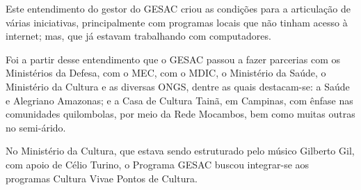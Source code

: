 \documentclass[
12pt,		%
openright,	%
twoside,  %
a4paper,			%
chapter=TITLE,		%
english,			%
french,				%
spanish,			%
brazil				%
]{USPSC-classe/USPSC}
\begin{document}
\noindent\begin{center}\mbox{\centering{}}\end{center}


Este entendimento do gestor do GESAC criou as condi\c{c}\~oes para a articula\c{c}\~ao de v\'arias iniciativas, principalmente com programas locais que n\~ao tinham acesso \`a internet; mas, que j\'a estavam trabalhando com computadores.









Foi a partir desse entendimento que o GESAC passou a fazer parcerias com os Minist\'erios da Defesa, com o MEC, com o MDIC, o Minist\'erio da Sa\'ude, o Minist\'erio da Cultura e as diversas ONGS, dentre as quais destacam-se: a \textquotedbl Sa\'ude e Alegria\textquotedbl  no Amazonas; e a \textquotedbl Casa de Cultura Tain\~a\textquotedbl , em Campinas, com \^enfase nas comunidades quilombolas, por meio da Rede Mocambos, bem como muitas outras no semi-\'arido.










\noindent\begin{center}\mbox{\centering{}}\end{center}


No Minist\'erio da Cultura, que estava sendo estruturado pelo m\'usico Gilberto Gil, com apoio de C\'elio Turino, o Programa GESAC buscou integrar-se aos programas \textquotedbl Cultura Viva\textquotedbl  e \textquotedbl Pontos de Cultura\textquotedbl .
\end{document}
